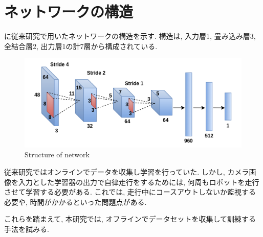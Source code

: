 \newpage
\section{ネットワークの構造}
に従来研究で用いたネットワークの構造を示す. 構造は, 入力層1, 畳み込み層3, 全結合層2, 出力層1の計7層から構成されている.

\begin{figure}[h]
  \centering
  \includegraphics[keepaspectratio, scale=0.6]{images/cnn.png}
  \caption{Structure of network}
  \label{Fig:cnn}
  \end{figure}

\vspace{10mm}
従来研究ではオンラインでデータを収集し学習を行っていた. しかし, カメラ画像を入力とした学習器の出力で自律走行をするためには, 何周もロボットを走行させて学習する必要がある. これでは, 走行中にコースアウトしないか監視する必要や, 時間がかかるといった問題点がある. \par これらを踏まえて, 本研究では, オフラインでデータセットを収集して訓練する手法を試みる. 

